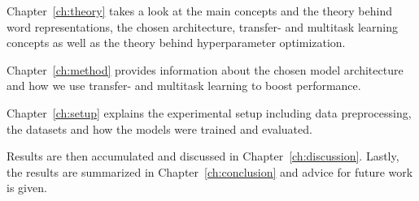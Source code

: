Chapter~\ref{ch:theory} takes a look at the main concepts and the theory behind word representations, the chosen architecture, transfer- and multitask learning concepts as well as the theory behind hyperparameter optimization.
\smallskip

Chapter~\ref{ch:method} provides information about the chosen model architecture and how we use transfer- and multitask learning to boost performance.
\smallskip

Chapter~\ref{ch:setup} explains the experimental setup including data preprocessing, the datasets and how the models were trained and evaluated.
\smallskip

Results are then accumulated and discussed in Chapter~\ref{ch:discussion}. Lastly, the results are
summarized in Chapter~\ref{ch:conclusion} and advice for future work is given.

